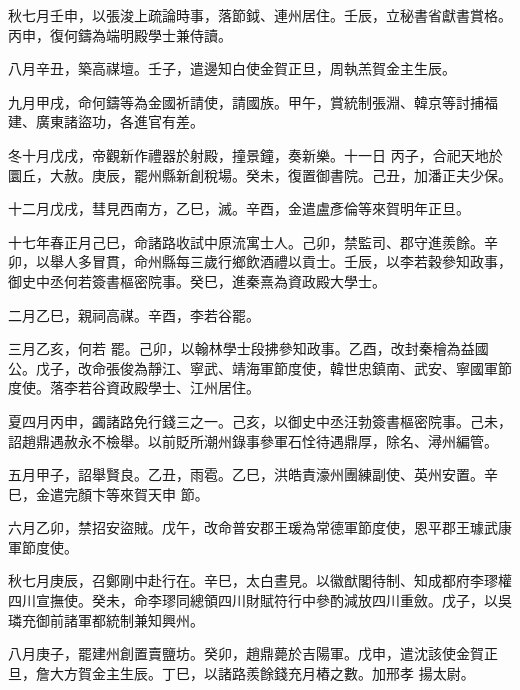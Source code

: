 \begin{pinyinscope}
 秋七月壬申，以張浚上疏論時事，落節鉞、連州居住。壬辰，立秘書省獻書賞格。丙申，復何鑄為端明殿學士兼侍讀。



 八月辛丑，築高禖壇。壬子，遣邊知白使金賀正旦，周執羔賀金主生辰。



 九月甲戌，命何鑄等為金國祈請使，請國族。甲午，賞統制張淵、韓京等討捕福建、廣東諸盜功，各進官有差。



 冬十月戊戌，帝觀新作禮器於射殿，撞景鐘，奏新樂。十一日
 丙子，合祀天地於圜丘，大赦。庚辰，罷州縣新創稅場。癸未，復置御書院。己丑，加潘正夫少保。



 十二月戊戌，彗見西南方，乙巳，滅。辛酉，金遣盧彥倫等來賀明年正旦。



 十七年春正月己巳，命諸路收試中原流寓士人。己卯，禁監司、郡守進羨餘。辛卯，以舉人多冒貫，命州縣每三歲行鄉飲酒禮以貢士。壬辰，以李若穀參知政事，御史中丞何若簽書樞密院事。癸巳，進秦熹為資政殿大學士。



 二月乙巳，親祠高禖。辛酉，李若谷罷。



 三月乙亥，何若
 罷。己卯，以翰林學士段拂參知政事。乙酉，改封秦檜為益國公。戊子，改命張俊為靜江、寧武、靖海軍節度使，韓世忠鎮南、武安、寧國軍節度使。落李若谷資政殿學士、江州居住。



 夏四月丙申，蠲諸路免行錢三之一。己亥，以御史中丞汪勃簽書樞密院事。己未，詔趙鼎遇赦永不檢舉。以前貶所潮州錄事參軍石恮待遇鼎厚，除名、潯州編管。



 五月甲子，詔舉賢良。乙丑，雨雹。乙巳，洪皓責濠州團練副使、英州安置。辛巳，金遣完顏卞等來賀天申
 節。



 六月乙卯，禁招安盜賊。戊午，改命普安郡王瑗為常德軍節度使，恩平郡王璩武康軍節度使。



 秋七月庚辰，召鄭剛中赴行在。辛巳，太白晝見。以徽猷閣待制、知成都府李璆權四川宣撫使。癸未，命李璆同總領四川財賦符行中參酌減放四川重斂。戊子，以吳璘充御前諸軍都統制兼知興州。



 八月庚子，罷建州創置賣鹽坊。癸卯，趙鼎薨於吉陽軍。戊申，遣沈該使金賀正旦，詹大方賀金主生辰。丁巳，以諸路羨餘錢充月樁之數。加邢孝
 揚太尉。




\end{pinyinscope}
